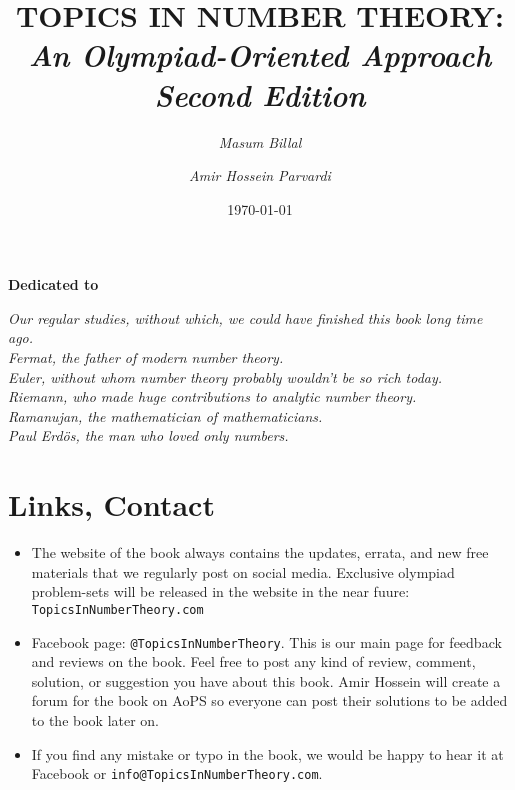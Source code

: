 \documentclass[12pt]{book}
\title{\bf TOPICS IN NUMBER THEORY:\\ \it An Olympiad-Oriented Approach\\Second Edition}
\author{
	\it Masum Billal%
	\and
	\it Amir Hossein Parvardi%
}
\date{\today}
\begin{document}
\frontmatter
\maketitle
\pagestyle{plain}

\begin{dedication}
	\begin{center}
		\textbf{Dedicated to}
	\end{center}\slshape
	Our regular studies, without which, we could have finished this book long time ago.\\
	Fermat, the father of modern number theory.\\
	Euler, without whom number theory probably wouldn't be so rich today.\\
	Riemann, who made huge contributions to analytic number theory.\\
	Ramanujan, the mathematician of mathematicians.\\
	Paul Erd\"{o}s, the man who loved only numbers.
\end{dedication}

\section*{Links, Contact}

\begin{itemize}
	\item The website of the book always contains the updates, errata, and new free materials that we regularly post on social media. Exclusive olympiad problem-sets will be released in the website in the near fuure: \texttt{TopicsInNumberTheory.com}
	\item Facebook page: \texttt{@TopicsInNumberTheory}. This is our main page for feedback and reviews on the book. Feel free to post any kind of review, comment, solution, or suggestion you have about this book. Amir Hossein will create a forum for the book on AoPS so everyone can post their solutions to be added to the book later on.
	\item If you find any mistake or typo in the book, we would be happy to hear it at Facebook or \texttt{info@TopicsInNumberTheory.com}.
\end{itemize}
\end{document}
